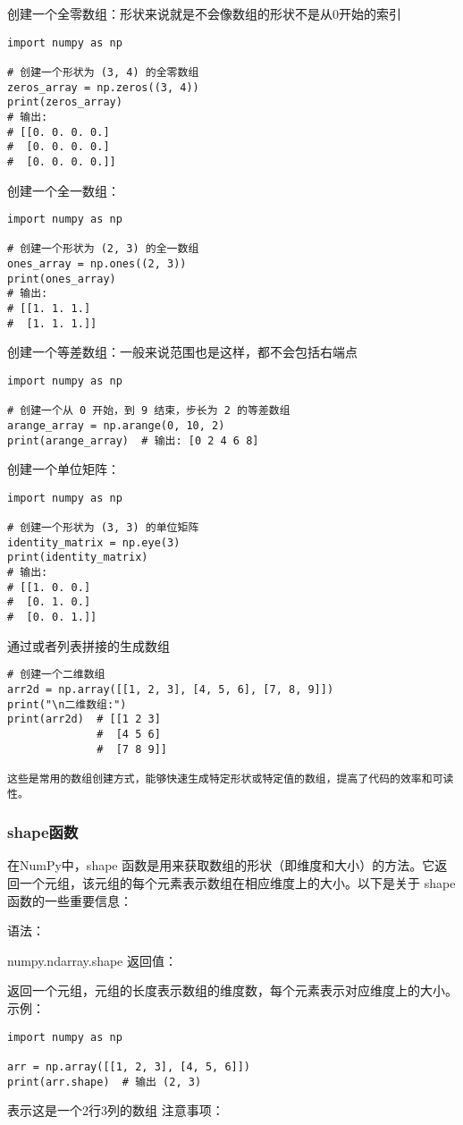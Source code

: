 \documentclass{article}
\begin{document}
创建一个全零数组：形状来说就是不会像数组的形状不是从0开始的索引
\begin{lstlisting}[caption={示例Python代码}]
import numpy as np

# 创建一个形状为 (3, 4) 的全零数组
zeros_array = np.zeros((3, 4))
print(zeros_array)
# 输出:
# [[0. 0. 0. 0.]
#  [0. 0. 0. 0.]
#  [0. 0. 0. 0.]]
\end{lstlisting}
创建一个全一数组：
\begin{lstlisting}[caption={示例Python代码}]
import numpy as np

# 创建一个形状为 (2, 3) 的全一数组
ones_array = np.ones((2, 3))
print(ones_array)
# 输出:
# [[1. 1. 1.]
#  [1. 1. 1.]]
\end{lstlisting}
创建一个等差数组：一般来说范围也是这样，都不会包括右端点
\begin{lstlisting}[caption={示例Python代码}]
import numpy as np

# 创建一个从 0 开始，到 9 结束，步长为 2 的等差数组
arange_array = np.arange(0, 10, 2)
print(arange_array)  # 输出: [0 2 4 6 8]
\end{lstlisting}
创建一个单位矩阵：
\begin{lstlisting}[caption={示例Python代码}]
import numpy as np

# 创建一个形状为 (3, 3) 的单位矩阵
identity_matrix = np.eye(3)
print(identity_matrix)
# 输出:
# [[1. 0. 0.]
#  [0. 1. 0.]
#  [0. 0. 1.]]
\end{lstlisting}
通过或者列表拼接的生成数组
\begin{lstlisting}[caption={示例Python代码}]
# 创建一个二维数组
arr2d = np.array([[1, 2, 3], [4, 5, 6], [7, 8, 9]])
print("\n二维数组:")
print(arr2d)  # [[1 2 3]
              #  [4 5 6]
              #  [7 8 9]]

这些是常用的数组创建方式，能够快速生成特定形状或特定值的数组，提高了代码的效率和可读性。
\end{lstlisting}
\subsubsection{shape函数}
在NumPy中，shape 函数是用来获取数组的形状（即维度和大小）的方法。它返回一个元组，该元组的每个元素表示数组在相应维度上的大小。以下是关于 shape 函数的一些重要信息：

语法：

numpy.ndarray.shape
返回值：

返回一个元组，元组的长度表示数组的维度数，每个元素表示对应维度上的大小。
示例：
\begin{lstlisting}[caption={示例Python代码}]
import numpy as np

arr = np.array([[1, 2, 3], [4, 5, 6]])
print(arr.shape)  # 输出 (2, 3)
\end{lstlisting}
表示这是一个2行3列的数组
注意事项：
\end{document}
